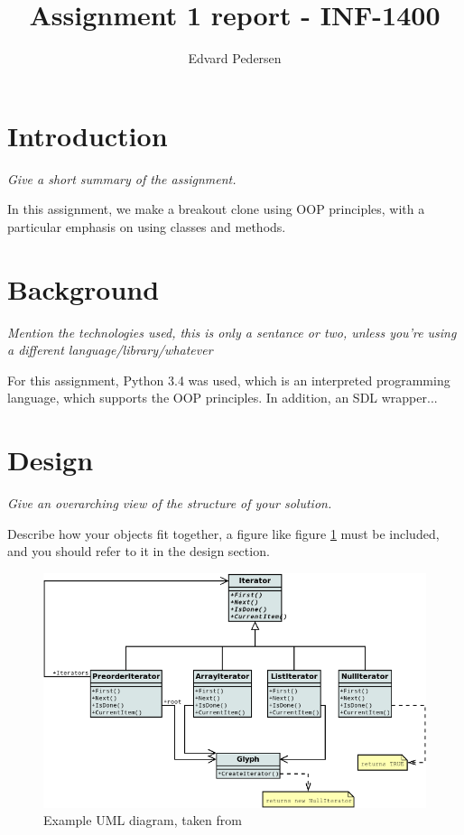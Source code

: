 \documentclass[11pt]{article}
\title{Assignment 1 report - INF-1400}
\author{Edvard Pedersen}
\begin{document}
\maketitle

\section{Introduction}

\emph{Give a short summary of the assignment.}

In this assignment, we make a breakout clone using OOP principles, with a particular emphasis on using classes and methods.

\section{Background}

\emph{Mention the technologies used, this is only a sentance or two, unless you're using a different language/library/whatever}

For this assignment, Python 3.4\cite{python} was used, which is an interpreted programming language, which supports the OOP principles. In addition, an SDL wrapper...

\section{Design}

\emph{Give an overarching view of the structure of your solution.}

Describe how your objects fit together, a figure like figure \ref{umlfig} must be included, and you should refer to it in the design section.

\begin{figure}[h]
	\centering
	\includegraphics[width=\textwidth]{UML.png}
	\caption{Example UML diagram, taken from \cite{umlsource}}
	\label{umlfig}
\end{figure}
\end{document}
